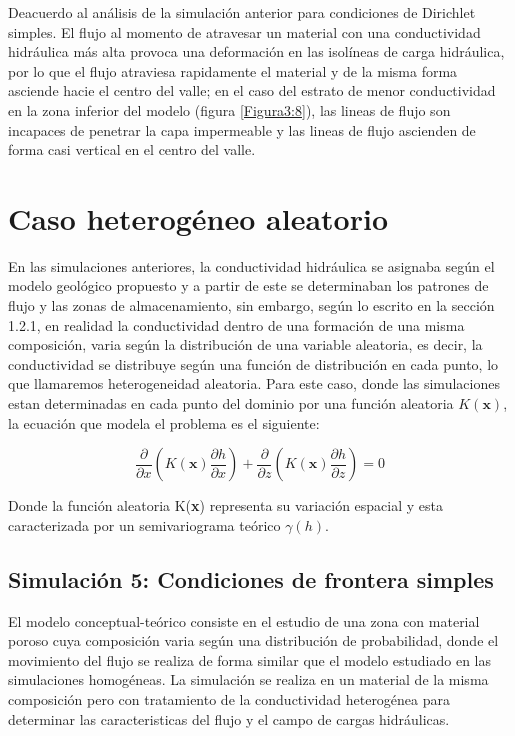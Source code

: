 Deacuerdo al análisis de la simulación anterior para condiciones de Dirichlet simples. El flujo al momento de atravesar un material con una conductividad hidráulica más alta provoca una deformación en las isolíneas de carga hidráulica, por lo que el flujo atraviesa rapidamente el material y de la misma forma asciende hacie el centro del valle; en el caso del estrato de menor conductividad en la zona inferior del modelo (figura \ref{Figura3:8}), las lineas de flujo son incapaces de penetrar la capa impermeable y las lineas de flujo ascienden de forma casi vertical en el centro del valle.

\section{Caso heterogéneo aleatorio}

En las simulaciones anteriores, la conductividad hidráulica se asignaba según el modelo geológico propuesto y a partir de este se determinaban los patrones de flujo y las zonas de almacenamiento, sin embargo, según lo escrito en la sección 1.2.1,  en realidad la conductividad dentro de una formación de una misma composición, varia según la distribución de una variable aleatoria, es decir, la conductividad se distribuye según una función de distribución en cada punto, lo que llamaremos heterogeneidad aleatoria. Para este caso, donde las simulaciones estan determinadas en cada punto del dominio por una función aleatoria $K(\textbf{x})$, la ecuación que modela el problema es el siguiente:

 \begin{equation}
\label{eqn:mys19}                         
\dfrac{\partial}{\partial{x}}(K(\textbf{x})\dfrac{\partial{h}}{\partial{x}})+\dfrac{\partial}{\partial{z}}(K(\textbf{x})\dfrac{\partial{h}}{\partial{z}})=0
\end{equation}

Donde la función aleatoria K(\textbf{x}) representa su variación espacial y esta caracterizada por un semivariograma teórico $\gamma(h)$. 

\subsection{Simulación 5: Condiciones de frontera simples}

El modelo conceptual-teórico consiste en el estudio de una zona con material poroso cuya composición varia según una distribución de probabilidad, donde el movimiento del flujo se realiza de forma similar que el modelo estudiado en las simulaciones homogéneas. La simulación se realiza en un material de la misma composición pero con tratamiento de la conductividad heterogénea para determinar las caracteristicas del flujo y el campo de cargas hidráulicas. 
\\

